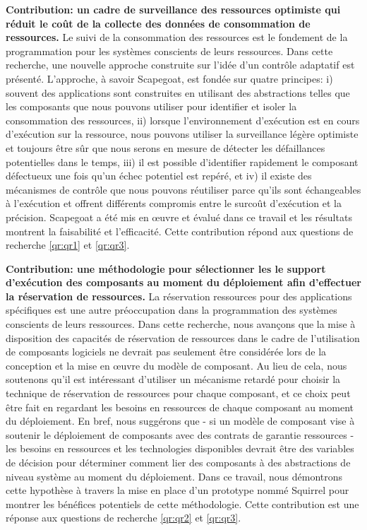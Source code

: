 \textbf{Contribution: un cadre de surveillance des ressources optimiste qui réduit le coût de la collecte des données de consommation de ressources.}
Le suivi de la consommation des ressources est le fondement de la programmation pour les systèmes conscients de leurs ressources.
Dans cette recherche, une nouvelle approche construite sur l'idée d'un contrôle adaptatif est présenté. L'approche, à savoir Scapegoat, est fondée sur quatre principes: i) souvent des applications sont construites en utilisant des abstractions telles que les composants que nous pouvons utiliser pour identifier et isoler la consommation des ressources, ii) lorsque l'environnement d'exécution est en cours d'exécution sur la ressource, nous pouvons utiliser la surveillance légère optimiste et toujours être sûr que nous serons en mesure de détecter les défaillances potentielles dans le temps, iii) il est possible d'identifier rapidement le composant défectueux une fois qu’un échec potentiel est repéré, et iv) il existe des mécanismes de contrôle que nous pouvons réutiliser parce qu'ils sont échangeables à l'exécution et offrent différents compromis entre le surcoût d’exécution et la précision. Scapegoat a été mis en œuvre et évalué dans ce travail et les résultats montrent la faisabilité et l'efficacité. Cette contribution répond aux questions de recherche \ref{qr:qr1} et \ref{qr:qr3}.

\textbf{Contribution: une méthodologie pour sélectionner les le support d’exécution des composants au moment du déploiement afin d'effectuer la réservation de ressources.}
La réservation ressources pour des applications spécifiques est une autre préoccupation dans la programmation des systèmes conscients de leurs ressources. Dans cette recherche, nous avançons que la mise à disposition des capacités de réservation de ressources dans le cadre de l’utilisation de composants logiciels ne devrait pas seulement être considérée lors de la conception et la mise en œuvre du modèle de composant. Au lieu de cela, nous soutenons qu'il est intéressant d'utiliser un mécanisme retardé pour choisir la technique de réservation de ressources pour chaque composant, et ce choix peut être fait en regardant les besoins en ressources de chaque composant au moment du déploiement. En bref, nous suggérons que - si un modèle de composant vise à soutenir le déploiement de composants avec des contrats de garantie ressources - les besoins en ressources et les technologies disponibles devrait être des variables de décision pour déterminer comment lier des composants à des abstractions de niveau système au moment du déploiement. Dans ce travail, nous démontrons cette hypothèse à travers la mise en place d’un prototype nommé Squirrel pour montrer les bénéfices potentiels de cette méthodologie. Cette contribution est une réponse aux questions de recherche \ref{qr:qr2} et \ref{qr:qr3}.

